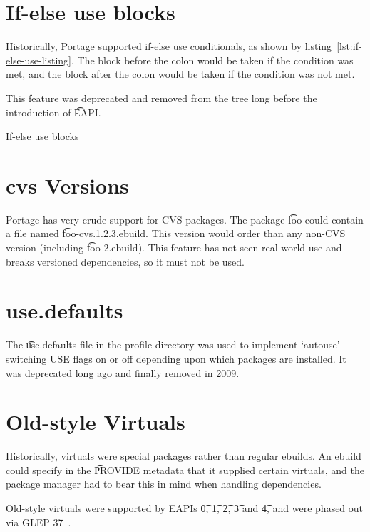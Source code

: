 \section{If-else use blocks}

Historically, Portage supported if-else use conditionals, as shown by
listing~\ref{lst:if-else-use-listing}. The block before the colon would be taken if the condition
was met, and the block after the colon would be taken if the condition was not met.

This feature was deprecated and removed from the tree long before the introduction of \t{EAPI}.

\begin{listing}
  \caption{If-else use blocks}\label{lst:if-else-use-listing}
  
\end{listing}

\section{cvs Versions}

Portage has very crude support for CVS packages. The package \t{foo} could contain a file named
\t{foo-cvs.1.2.3.ebuild}. This version would order  than any non-CVS version (including
\t{foo-2.ebuild}). This feature has not seen real world use and breaks versioned dependencies, so
it must not be used.

\section{use.defaults}

The \t{use.defaults} file in the profile directory was used to implement `autouse'---switching USE
flags on or off depending upon which packages are installed. It was deprecated long ago and finally
removed in 2009.

\section{Old-style Virtuals}

Historically, virtuals were special packages rather than regular ebuilds. An ebuild could specify in
the \t{PROVIDE} metadata that it supplied certain virtuals, and the package manager had to bear this
in mind when handling dependencies.

Old-style virtuals were supported by EAPIs \t{0}, \t{1}, \t{2}, \t{3} and \t{4}, and were phased out
via GLEP 37~\cite{Glep37}.


